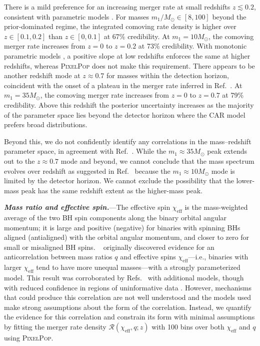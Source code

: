\documentclass[%
 reprint,
 amsmath,amssymb,
 aps,
 prd,
 nofootinbib,nobibnotes,
]{revtex4-2}
\newcommand{\heading}[1]{\textbf{\textit{#1.}}}
\begin{document}
There is a mild preference for an increasing merger rate at small redshifts $z \lesssim 0.2$, consistent with parametric models \cite{Fishbach:2018edt, Callister:2020arv, KAGRA:2021duu, Schiebelbein-Zwack:2024roj}. For masses $m_1 / M_\odot \in [8,100]$ beyond the prior-dominated regime, the integrated comoving rate density is higher over $z \in [0.1,0.2]$ than $z \in [0,0.1]$ at 67\% credibility. At $m_1 = 10M_\odot$, the comoving merger rate increases from $z=0$ to $z=0.2$ at 73\% credibility. With monotonic parametric models \cite{KAGRA:2021duu, Fishbach:2018edt}, a positive slope at low redshifts enforces the same at higher redshifts, whereas \textsc{PixelPop} does not make this requirement. There appears to be another redshift mode at $z\approx0.7$ for masses within the detection horizon, coincident with the onset of a plateau in the merger rate inferred in Ref.~\cite{Callister:2023tgi}. At $m_1 = 35M_\odot$, the comoving merger rate increases from $z=0$ to $z=0.7$ at 79\% credibility. Above this redshift the posterior uncertainty increases as the majority of the parameter space lies beyond the detector horizon where the CAR model prefers broad distributions.

Beyond this, we do not confidently identify any correlations in the mass--redshift parameter space, in agreement with Ref.~\cite{Ray:2023upk,Sadiq:2021fin}. While the $m_1 \approx 35 M_\odot$ peak extends out to the $z \approx 0.7$ mode and beyond, we cannot conclude that the mass spectrum evolves over redshift as suggested in Ref.~\cite{Rinaldi:2023bbd} because the $m_1 \approx 10 M_\odot$ mode is limited by the detector horizon. We cannot exclude the possibility that the lower-mass peak has the same redshift extent as the higher-mass peak.

\heading{Mass ratio and effective spin}---The effective spin $\chi_\mathrm{eff}$ is the mass-weighted average of the two BH spin components along the binary orbital angular momentum; it is large and positive (negative) for binaries with spinning BHs aligned (antialigned) with the orbital angular momentum, and closer to zero for small or misaligned BH spins. \citeauthor{Callister:2021fpo}~\cite{Callister:2021fpo} originally discovered evidence for an anticorrelation between mass ratios $q$ and effective spins $\chi_\mathrm{eff}$---i.e., binaries with larger $\chi_\mathrm{eff}$ tend to have more unequal masses---with a strongly parameterized model. This result was corroborated by Refs.~\cite{Adamcewicz:2022hce, Adamcewicz:2023mov, Heinzel:2023hlb, KAGRA:2021duu} with additional models, though with reduced confidence in regions of uninformative data \cite{Heinzel:2023hlb}. However, mechanisms that could produce this correlation are not well understood \cite{Broekgaarden:2022nst, Bavera:2020uch, Zevin:2022wrw, Gerosa:2021mno, McKernan:2021nwk, Santini:2023ukl, Baibhav:2022qxm, Santini:2023ukl, Olejak:2021iux, Olejak:2024qxr} and the models used make strong assumptions about the form of the correlation. Instead, we quantify the evidence for this correlation and constrain its form with minimal assumptions by fitting the merger rate density $\mathcal{R}(\chi_\mathrm{eff},q;z)$ with 100 bins over both $\chi_\mathrm{eff}$ and $q$ using \textsc{PixelPop}.
\end{document}
